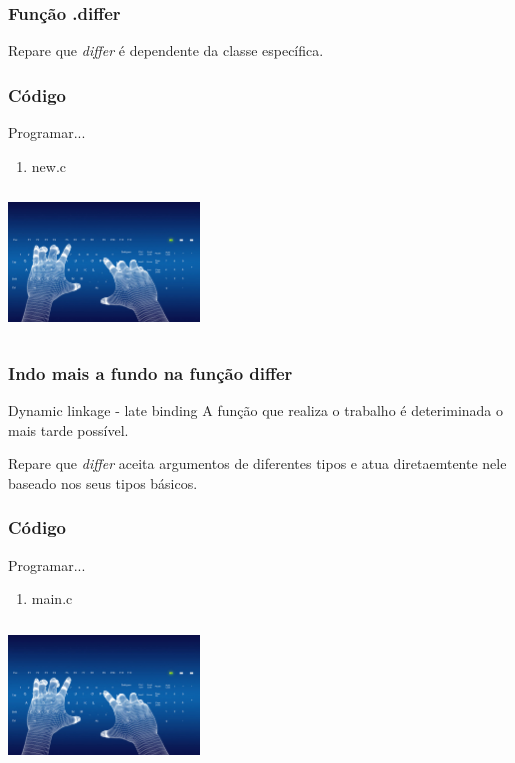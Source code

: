 \documentclass{beamer}
\begin{document}
\begin{frame}
 \frametitle{Função .differ}
  Repare que \textit{differ} é dependente da classe específica.
\end{frame}

\begin{frame}
  \frametitle{Código}
  Programar...
  \begin{enumerate}
   \item new.c
  \end{enumerate}

  \begin{center}
    \includegraphics[height = 1.5in, width = 2in]{image/programming.jpg}
  \end{center}
\end{frame}

\begin{frame}
 \frametitle{Indo mais a fundo na função differ}
  \begin{block}{Dynamic linkage - late binding}
   A função que realiza o trabalho é deteriminada o mais tarde possível.
  \end{block}
 
  Repare que \textit{differ} aceita argumentos de diferentes tipos e atua 
  diretaemtente nele baseado nos seus tipos básicos.
\end{frame}

\begin{frame}
  \frametitle{Código}
  Programar...
  \begin{enumerate}
   \item main.c
  \end{enumerate}

  \begin{center}
    \includegraphics[height = 1.5in, width = 2in]{image/programming.jpg}
  \end{center}
\end{frame}
\end{document}
